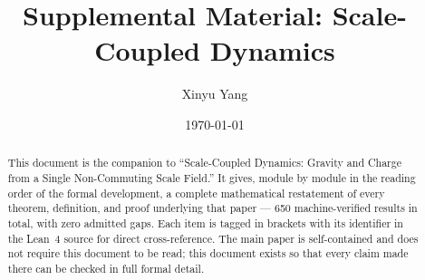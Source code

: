 \documentclass[aps,prd,superscriptaddress,nofootinbib]{revtex4-2}
\begin{document}
\title{Supplemental Material: Scale-Coupled Dynamics}
\author{Xinyu Yang}
\noaffiliation
\date{\today}

\begin{abstract}
This document is the companion to ``Scale-Coupled Dynamics: Gravity and
Charge from a Single Non-Commuting Scale Field.'' It gives, module by
module in the reading order of the formal development, a complete
mathematical restatement of every theorem, definition, and proof
underlying that paper — 650 machine-verified results in total, with zero
admitted gaps. Each item is tagged in brackets with its identifier in the
Lean~4 source for direct cross-reference. The main paper is
self-contained and does not require this document to be read; this
document exists so that every claim made there can be checked in full
formal detail.
\end{abstract}

\maketitle
\tableofcontents













\end{document}
